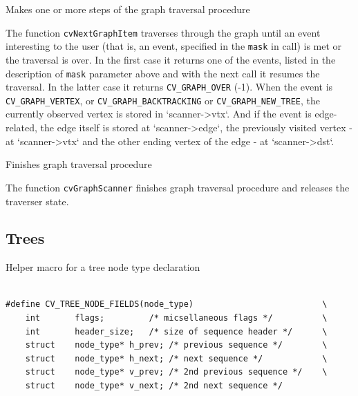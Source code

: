 \label{NextGraphItem}

Makes one or more steps of the graph traversal procedure


\begin{description}
\end{description}

The function \texttt{cvNextGraphItem} traverses through the graph
until an event interesting to the user (that is, an event, specified
in the \texttt{mask} in  call) is met or the
traversal is over. In the first case it returns one of the events,
listed in the description of \texttt{mask} parameter above and with
the next call it resumes the traversal. In the latter case it returns
\texttt{CV\_GRAPH\_OVER} (-1). When the event is \texttt{CV\_GRAPH\_VERTEX},
or \texttt{CV\_GRAPH\_BACKTRACKING} or \texttt{CV\_GRAPH\_NEW\_TREE},
the currently observed vertex is stored in `scanner->vtx`. And if the
event is edge-related, the edge itself is stored at `scanner->edge`,
the previously visited vertex - at `scanner->vtx` and the other ending
vertex of the edge - at `scanner->dst`.

\label{ReleaseGraphScanner}

Finishes graph traversal procedure


\begin{description}
\end{description}


The function \texttt{cvGraphScanner} finishes graph traversal procedure and releases the traverser state.


\subsection{Trees}


\label{CV_TREE_NODE_FIELDS}

Helper macro for a tree node type declaration

\begin{lstlisting}

#define CV_TREE_NODE_FIELDS(node_type)                          \
    int       flags;         /* micsellaneous flags */          \
    int       header_size;   /* size of sequence header */      \
    struct    node_type* h_prev; /* previous sequence */        \
    struct    node_type* h_next; /* next sequence */            \
    struct    node_type* v_prev; /* 2nd previous sequence */    \
    struct    node_type* v_next; /* 2nd next sequence */

\end{lstlisting}

